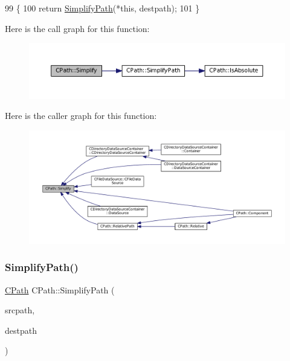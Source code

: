 \begin{DoxyCode}
99                                                 \{
100     \textcolor{keywordflow}{return} \hyperlink{classCPath_af0213a2ea0de0498ded236137e759922}{SimplifyPath}(*\textcolor{keyword}{this}, destpath);
101 \}
\end{DoxyCode}
Here is the call graph for this function\+:\nopagebreak
\begin{figure}[H]
\begin{center}
\leavevmode
\includegraphics[width=350pt]{classCPath_aa52dcb50c943a8abc8883db5ec43a45e_cgraph}
\end{center}
\end{figure}
Here is the caller graph for this function\+:\nopagebreak
\begin{figure}[H]
\begin{center}
\leavevmode
\includegraphics[width=350pt]{classCPath_aa52dcb50c943a8abc8883db5ec43a45e_icgraph}
\end{center}
\end{figure}
\hypertarget{classCPath_af0213a2ea0de0498ded236137e759922}{}\label{classCPath_af0213a2ea0de0498ded236137e759922} 
\subsubsection{\texorpdfstring{Simplify\+Path()}{SimplifyPath()}}
{\footnotesize\ttfamily \hyperlink{classCPath}{C\+Path} C\+Path\+::\+Simplify\+Path (\begin{DoxyParamCaption}\item[{const \hyperlink{classCPath}{C\+Path} \&}]{srcpath,  }\item[{const \hyperlink{classCPath}{C\+Path} \&}]{destpath }\end{DoxyParamCaption})\hspace{0.3cm}{\ttfamily [static]}}



